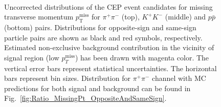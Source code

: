\begin{figure}[h]
{  \begin{subfigure}[b]{\linewidth}\addtocounter{subfigure}{-2}\vspace*{17pt}
  \end{subfigure}\\
  \begin{minipage}[t][1.042\linewidth][t]{\linewidth}\vspace{20pt}
    \caption[Uncorrected distributions of the CEP event candidates for missing transverse momentum $p_\mathrm{T}^\mathrm{\scriptscriptstyle miss}$ for $\pi^+\pi^-$ (top), $K^+K^-$ (middle) and $p\bar{p}$ (bottom) pairs.]{Uncorrected distributions of the CEP event candidates for missing transverse momentum $p_\mathrm{T}^\mathrm{\scriptscriptstyle miss}$ for $\pi^+\pi^-$ (top), $K^+K^-$ (middle) and $p\bar{p}$ (bottom) pairs. Distributions for opposite-sign and same-sign particle pairs are shown as black and red symbols, respectively. Estimated non-exclusive background contribution in the vicinity of signal region (low $p_{T}^{\text{miss}}$) has been drawn with magenta color. The vertical error bars represent statistical uncertainties. The horizontal bars represent bin sizes. Distribution for $\pi^+\pi^-$ channel with MC predictions for both signal and background can be found in Fig.~\ref{fig:Ratio_MissingPt_OppositeAndSameSign}.}\label{fig:MissingPt}
  \end{minipage}
}%
\end{figure}

